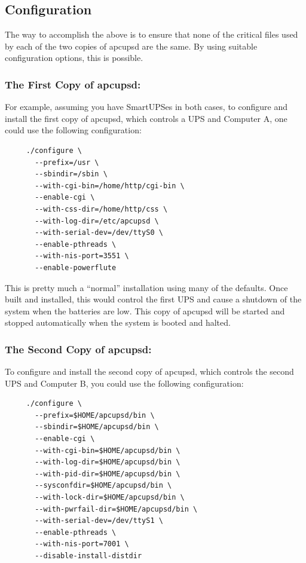 {{{{{{{{\label{Configuration}

\subsection*{Configuration}

The way to accomplish the above is to ensure that none of the critical files
used by each of the two copies of apcupsd are the same. By using suitable
configuration options, this is possible. 

\label{The-First-Copy-of-apcupsd}

\subsubsection*{The First Copy of apcupsd:}

For example, assuming you have SmartUPSes in both cases, to configure and
install the first copy of apcupsd, which controls a UPS and Computer A, one
could use the following configuration: 

\footnotesize
\begin{verbatim}
     ./configure \
       --prefix=/usr \
       --sbindir=/sbin \
       --with-cgi-bin=/home/http/cgi-bin \
       --enable-cgi \
       --with-css-dir=/home/http/css \
       --with-log-dir=/etc/apcupsd \
       --with-serial-dev=/dev/ttyS0 \
       --enable-pthreads \
       --with-nis-port=3551 \
       --enable-powerflute
\end{verbatim}
\normalsize

This is pretty much a ``normal'' installation using many of the defaults. Once
built and installed, this would control the first UPS and cause a shutdown of
the system when the batteries are low.  This copy of apcupsd will be started
and stopped automatically when the system is booted and halted. 

\label{The-Second-Copy-of-apcupsd}

\subsubsection*{The Second Copy of apcupsd:}

\label{index-Two-apcupsds-161}
To configure and install the second copy of apcupsd, which controls the second
UPS and Computer B, you could use the following configuration: 

\footnotesize
\begin{verbatim}
     ./configure \
       --prefix=$HOME/apcupsd/bin \
       --sbindir=$HOME/apcupsd/bin \
       --enable-cgi \
       --with-cgi-bin=$HOME/apcupsd/bin \
       --with-log-dir=$HOME/apcupsd/bin \
       --with-pid-dir=$HOME/apcupsd/bin \
       --sysconfdir=$HOME/apcupsd/bin \
       --with-lock-dir=$HOME/apcupsd/bin \
       --with-pwrfail-dir=$HOME/apcupsd/bin \
       --with-serial-dev=/dev/ttyS1 \
       --enable-pthreads \
       --with-nis-port=7001 \
       --disable-install-distdir
\end{verbatim}
\normalsize

}}}}}}}}
